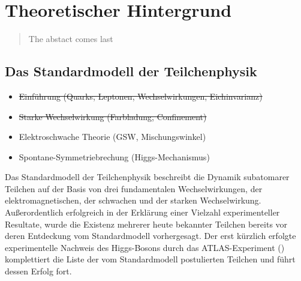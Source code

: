 


\chapter{Theoretischer Hintergrund}

\begin{quote}
    The abstact comes last
\end{quote}



\section{Das Standardmodell der Teilchenphysik}
\label{theory:standardmodell}

\begin{itemize}
    \item \sout{Einführung (Quarks, Leptonen, Wechselwirkungen, Eichinvarianz)}
    \item \sout{Starke Wechselwirkung (Farbladung, Confinement)}
    \item Elektroschwache Theorie (GSW, Mischungswinkel)
    \item Spontane-Symmetriebrechung (Higgs-Mechanismus)
\end{itemize}

Das Standardmodell der Teilchenphysik beschreibt die Dynamik subatomarer
Teilchen auf der Basis von drei fundamentalen Wechselwirkungen, der
elektromagnetischen, der schwachen und der starken Wechselwirkung.
Außerordentlich erfolgreich in der Erklärung einer Vielzahl experimenteller
Resultate, wurde die Existenz mehrerer heute bekannter Teilchen bereits vor
deren Entdeckung vom Standardmodell vorhergesagt. Der erst kürzlich erfolgte
experimentelle Nachweis des Higgs-Bosons durch das ATLAS-Experiment
(\cite{Aad:2012tfa}) komplettiert die Liste der vom Standardmodell postulierten
Teilchen und führt dessen Erfolg fort.

